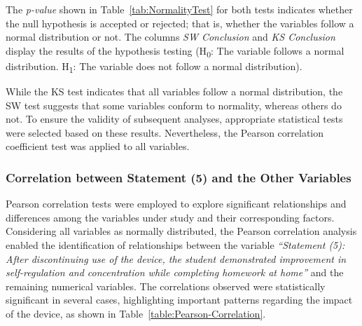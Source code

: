                 The \textit{p-value} shown in Table~\ref{tab:NormalityTest} for both tests indicates whether the null hypothesis is accepted or rejected; that is, whether the variables follow a normal distribution or not. The columns \textit{SW Conclusion} and \textit{KS Conclusion} display the results of the hypothesis testing (H\textsubscript{0}: The variable follows a normal distribution. H\textsubscript{1}: The variable does not follow a normal distribution).
                
                While the KS test indicates that all variables follow a normal distribution, the SW test suggests that some variables conform to normality, whereas others do not. To ensure the validity of subsequent analyses, appropriate statistical tests were selected based on these results. Nevertheless, the Pearson correlation coefficient test was applied to all variables.
                
                \subsubsection{Correlation between Statement (5) and the Other Variables}
                Pearson correlation tests were employed to explore significant relationships and differences among the variables under study and their corresponding factors. Considering all variables as normally distributed, the Pearson correlation analysis enabled the identification of relationships between the variable \textit{``Statement (5): \textit{After discontinuing use of the device, the student demonstrated improvement in self-regulation and concentration while completing homework at home}''} and the remaining numerical variables. The correlations observed were statistically significant in several cases, highlighting important patterns regarding the impact of the device, as shown in Table~\ref{table:Pearson-Correlation}.
                
